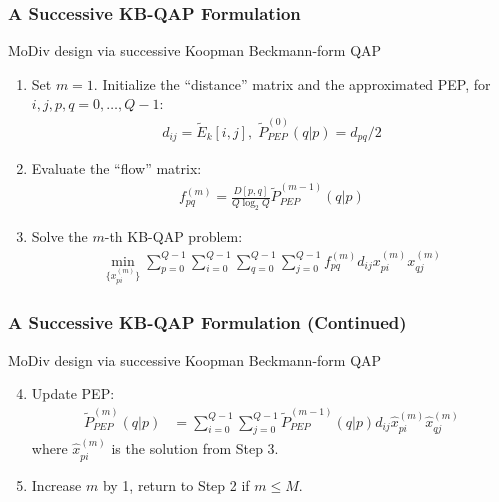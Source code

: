 \documentclass{beamer}
\begin{document}
\begin{frame}
  \frametitle{A Successive KB-QAP Formulation}
  \begin{block}{MoDiv design via successive Koopman Beckmann-form QAP}
    \begin{enumerate}[<+->]
      \item Set $m = 1$. Initialize the ``distance'' matrix and the approximated
      PEP, for $i,j,p,q=0,\ldots,Q-1$:
      \begin{align*}
        d_{ij} = \tilde{E}_k[i,j],\; \tilde{P}_{PEP}^{(0)}(q|p) = d_{pq}/2
      \end{align*}
      \item Evaluate the ``flow'' matrix:
      \begin{align*}
        f_{pq}^{(m)} = \frac{D[p,q]}{Q\log_2Q}\tilde{P}_{PEP}^{(m-1)}(q|p)
      \end{align*}
      \item Solve the $m$-th KB-QAP problem:
      \begin{align*}
        \min_{\{x_{pi}^{(m)}\}}
        \sum_{p=0}^{Q-1}\sum_{i=0}^{Q-1}
        \sum_{q=0}^{Q-1}\sum_{j=0}^{Q-1}
        f_{pq}^{(m)}d_{ij}x_{pi}^{(m)}x_{qj}^{(m)}
      \end{align*}
    \end{enumerate}
  \end{block}
\end{frame}

\begin{frame}
  \frametitle{A Successive KB-QAP Formulation (Continued)}
  \begin{block}{MoDiv design via successive Koopman Beckmann-form QAP}
    \begin{enumerate}[<+->]
      \setcounter{enumi}{3}
      \item Update PEP:
      \begin{align*}
        \tilde{P}_{PEP}^{(m)}(q|p) & = \sum_{i=0}^{Q-1}
        \sum_{j=0}^{Q-1}\tilde{P}_{PEP}^{(m
        - 1)}(q|p)d_{ij}\hat{x}_{pi}^{(m)}\hat{x}_{qj}^{(m)}
      \end{align*}
      where $\hat{x}_{pi}^{(m)}$ is the solution from Step 3.
      \item Increase $m$ by 1, return to Step 2 if $m \leq M$.
    \end{enumerate}
  \end{block}
  \vfill
\end{frame}
\end{document}
